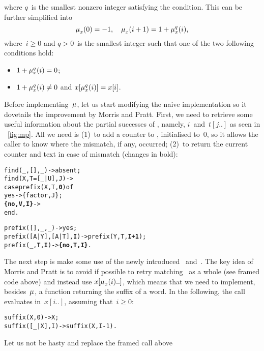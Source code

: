 where \(q\)~is the smallest nonzero integer satisfying the
condition. This can be further simplified into
\begin{equation}
\mu_{x}^{}(0) = -1,
\quad
\mu_{x}^{}(i+1) = 1 + \mu_{x}^{q}(i),
\label{eq:MPfailure}
\end{equation}
where~\({i \geqslant 0}\) and \({q>0}\)~is the smallest integer such
that one of the two following conditions hold:
\begin{itemize}

  \item \(1 + \mu_{x}^{q}(i) = 0\);

  \item \(1 + \mu_{x}^{q}(i) \neq 0\) and
    \(x[\mu_{x}^{q}(i)] = x[i]\).

\end{itemize}
Before implementing~\(\mu\), let us start modifying the
naive implementation  so it dovetails the
improvement by Morris and Pratt. First, we need to retrieve some
useful information about the partial successes of ,
namely, \(i\)~and~\(t[j..]\) as seen in \fig~\vref{fig:mp}. All we
need is (1)~to add a counter to , initialised
to~\(0\), so it allows the caller to know where the mismatch, if any,
occurred; (2)~to return the current counter and text in case of
mismatch (changes in bold):
\begin{alltt}
find(_,     [],_) -> absent;
find(X,T=[_|U],J) ->
  case prefix(X,T,\textbf{0}) of
    yes      -> \{factor,J\};
    \textbf{\{no,V,I\}} -> \hfill% V \emph{is} \(t[j..]\)
  end.

prefix(   [],    _,_) -> yes;
prefix([A|Y],[A|T],\textbf{I}) -> prefix(Y,T,\textbf{I+1});
prefix(    _,    \textbf{T},\textbf{I}) -> \textbf{\{no,T,I\}}.
\end{alltt}
The next step is make some use of the newly introduced
~and~. The key idea of Morris and Pratt is to
avoid if possible to retry matching~ as a whole (see framed
code above) and instead use \(x[\mu_{x}^{}(i)..]\), which means
that we need to implement, besides~\(\mu\), a function
returning the suffix of a word. In the following, the call
 evaluates in~\(x[i..]\), assuming
that~\({i \geqslant 0}\):
\begin{alltt}
suffix(    X,0) -> X;
suffix([_|X],I) -> suffix(X,I-1).
\end{alltt}
Let us not be hasty and replace the framed call above
